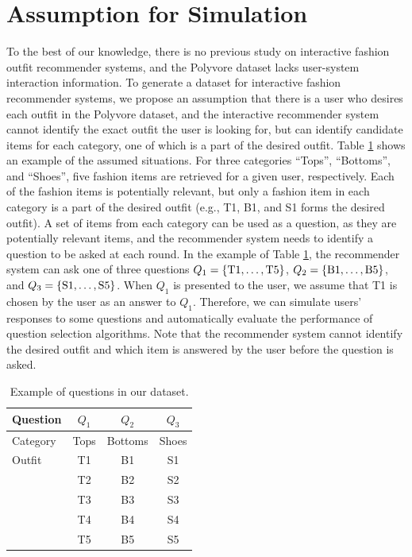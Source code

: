 \section{Assumption for Simulation}
To the best of our knowledge, there is no previous study on interactive fashion outfit recommender systems, and the Polyvore dataset lacks user-system interaction information. 
To generate a dataset for interactive fashion recommender systems, 
we propose an assumption that
there is a user who desires each outfit in the Polyvore dataset,
and the interactive recommender system
cannot identify the exact outfit the user is looking for,
but can identify candidate items for each category,
one of which is a part of the desired outfit.
Table \ref{tb:example_questions} shows an example of 
the assumed situations.
For three categories ``Tops'',
``Bottoms'', and ``Shoes'',
five fashion items are retrieved for a given user, respectively.
Each of the fashion items is potentially relevant,
but only a fashion item in each category is a part of the desired outfit (e.g., T1, B1, and S1 forms the desired outfit). 
A set of items from each category can be used as a question,
as they are potentially relevant items,
and the recommender system needs to identify a question to be asked at each round.
In the example of Table \ref{tb:example_questions},
the recommender system can ask one of three questions 
$Q_1=\{{\rm T1}, \ldots, {\rm T5}\}$, $Q_2=\{{\rm B1}, \ldots, {\rm B5}\}$, and $Q_3=\{{\rm S1}, \ldots, {\rm S5}\}$.
When $Q_1$ is presented to the user, 
we assume that T1 is chosen by the user as an answer to $Q_1$.
Therefore, we can simulate users' responses to some questions 
and automatically evaluate the performance of question selection algorithms.
Note that the recommender system cannot 
identify the desired outfit and 
which item is answered by the user before the question is asked.


\begin{table}[t]
  \centering
  \caption{Example of questions in our dataset.}
  \begin{tabular}{lccc}
  \toprule 
    Question&$Q_1$&$Q_2$&$Q_3$\\
    \midrule
    Category&Tops&Bottoms&Shoes\\
    \midrule
    Outfit&T1&B1&S1\\
    \midrule
    &T2&B2&S2\\
    &T3&B3&S3\\
    &T4&B4&S4\\
    &T5&B5&S5\\
  \bottomrule
  \end{tabular}
  \label{tb:example_questions}
\end{table}


